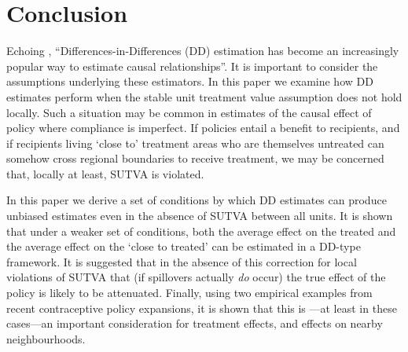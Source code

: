

\section{Conclusion}
Echoing \citet{Bertrandetal2004}, ``Differences-in-Differences (DD) estimation 
has become an increasingly popular way to estimate causal relationships''.  
It is important to consider the assumptions underlying these estimators.  
In this paper we examine how DD estimates perform when the stable unit treatment 
value assumption does not hold locally.  Such a situation may be common in estimates 
of the causal effect of policy where compliance is imperfect.  If policies entail a 
benefit to recipients, and if recipients living `close to' treatment areas who are 
themselves untreated can somehow cross regional boundaries to receive treatment, we 
may be concerned that, locally at least, SUTVA is violated.

In this paper we derive a set of conditions by which DD estimates can produce 
unbiased estimates even in the absence of SUTVA between all units.  It is shown
that under a weaker set of conditions, both the average effect on the treated
and the average effect on the `close to treated' can be estimated in a DD-type
framework.  It is suggested that in the absence of this correction for local 
violations of SUTVA that (if spillovers actually \emph{do} occur) the true 
effect of the policy is likely to be attenuated.  Finally, using two empirical 
examples from recent contraceptive policy expansions, it is shown that this is%
---at least in these cases---an important consideration for treatment effects, 
and effects on nearby neighbourhoods.


\newpage

\appendix
